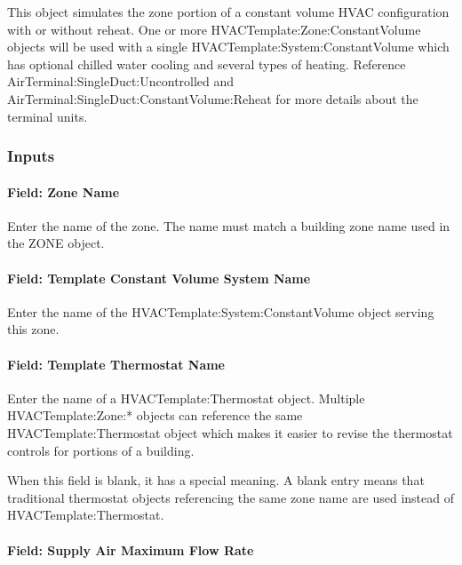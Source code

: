 This object simulates the zone portion of a constant volume HVAC configuration with or without reheat. One or more HVACTemplate:Zone:ConstantVolume objects will be used with a single HVACTemplate:System:ConstantVolume which has optional chilled water cooling and several types of heating. Reference AirTerminal:SingleDuct:Uncontrolled and AirTerminal:SingleDuct:ConstantVolume:Reheat for more details about the terminal units.

\subsubsection{Inputs}\label{inputs-12-006}

\paragraph{Field: Zone Name}\label{field-zone-name-11}

Enter the name of the zone. The name must match a building zone name used in the ZONE object.

\paragraph{Field: Template Constant Volume System Name}\label{field-template-constant-volume-system-name}

Enter the name of the HVACTemplate:System:ConstantVolume object serving this zone.

\paragraph{Field: Template Thermostat Name}\label{field-template-thermostat-name-11}

Enter the name of a HVACTemplate:Thermostat object. Multiple HVACTemplate:Zone:* objects can reference the same HVACTemplate:Thermostat object which makes it easier to revise the thermostat controls for portions of a building.

When this field is blank, it has a special meaning. A blank entry means that traditional thermostat objects referencing the same zone name are used instead of HVACTemplate:Thermostat.

\paragraph{Field: Supply Air Maximum Flow Rate}\label{field-supply-air-maximum-flow-rate-4}

